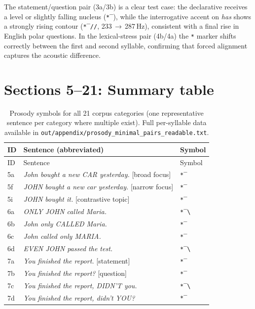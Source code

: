 \noindent
The statement/question pair (3a/3b) is a clear test case:
the declarative receives a level or slightly falling nucleus (\texttt{*‾}),
while the interrogative accent on \textit{has} shows a strongly rising contour
(\texttt{*‾//}, 233\,$\to$\,287\,Hz), consistent with a final rise in English
polar questions.
In the lexical-stress pair (4b/4a) the \texttt{*} marker shifts correctly
between the first and second syllable, confirming that forced alignment captures
the acoustic difference.

\section*{Sections 5--21: Summary table}

\begin{longtable}{lll}
\caption{Prosody symbols for all 21 corpus categories (one representative sentence
per category where multiple exist). Full per-syllable data available in
\texttt{out/appendix/prosody\_minimal\_pairs\_readable.txt}.} \\
\toprule
ID & Sentence (abbreviated) & Symbol \\
\midrule
\endfirsthead
\toprule
ID & Sentence & Symbol \\
\midrule
\endhead
\bottomrule
\endfoot
5a  & \textit{John bought a new CAR yesterday.} [broad focus]    & \texttt{*‾} \\
5f  & \textit{JOHN bought a new car yesterday.} [narrow focus]   & \texttt{*‾} \\
5i  & \textit{JOHN bought it.} [contrastive topic]               & \texttt{*‾} \\
6a  & \textit{ONLY JOHN called Maria.}                           & \texttt{*‾\textbackslash} \\
6b  & \textit{John only CALLED Maria.}                           & \texttt{*‾} \\
6c  & \textit{John called only MARIA.}                           & \texttt{*‾} \\
6d  & \textit{EVEN JOHN passed the test.}                        & \texttt{*‾\textbackslash} \\
7a  & \textit{You finished the report.} [statement]              & \texttt{*‾} \\
7b  & \textit{You finished the report?} [question]               & \texttt{*‾} \\
7c  & \textit{You finished the report, DIDN'T you.}              & \texttt{*‾\textbackslash} \\
7d  & \textit{You finished the report, didn't YOU?}              & \texttt{*‾} \\

\end{longtable}

